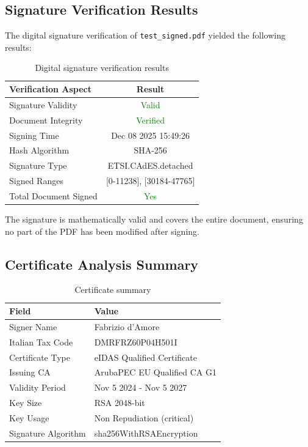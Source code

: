 \documentclass[12pt,a4paper]{article}
\begin{document}
\subsection{Signature Verification Results}

The digital signature verification of \texttt{test\_signed.pdf} yielded the following results:

\begin{table}[H]
\centering
\begin{tabular}{lc}
\toprule
\textbf{Verification Aspect} & \textbf{Result} \\
\midrule
Signature Validity & \textcolor{green}{Valid} \\
Document Integrity & \textcolor{green}{Verified} \\
Signing Time & Dec 08 2025 15:49:26 \\
Hash Algorithm & SHA-256 \\
Signature Type & ETSI.CAdES.detached \\
Signed Ranges & [0-11238], [30184-47765] \\
Total Document Signed & \textcolor{green}{Yes} \\
\bottomrule
\end{tabular}
\caption{Digital signature verification results}
\end{table}

The signature is mathematically valid and covers the entire document, ensuring no part of the PDF has been modified after signing.

\subsection{Certificate Analysis Summary}

\begin{table}[H]
\centering
\begin{tabular}{ll}
\toprule
\textbf{Field} & \textbf{Value} \\
\midrule
Signer Name & Fabrizio d'Amore \\
Italian Tax Code & DMRFRZ60P04H501I \\
Certificate Type & eIDAS Qualified Certificate \\
Issuing CA & ArubaPEC EU Qualified CA G1 \\
Validity Period & Nov 5 2024 - Nov 5 2027 \\
Key Size & RSA 2048-bit \\
Key Usage & Non Repudiation (critical) \\
Signature Algorithm & sha256WithRSAEncryption \\
\bottomrule
\end{tabular}
\caption{Certificate summary}
\end{table}
\end{document}
